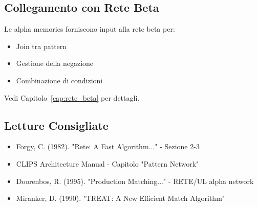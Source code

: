 \subsection{Collegamento con Rete Beta}

Le alpha memories forniscono input alla rete beta per:
\begin{itemize}
\item Join tra pattern
\item Gestione della negazione
\item Combinazione di condizioni
\end{itemize}

Vedi Capitolo~\ref{cap:rete_beta} per dettagli.

\subsection{Letture Consigliate}

\begin{itemize}
\item Forgy, C. (1982). "Rete: A Fast Algorithm..." - Sezione 2-3
\item CLIPS Architecture Manual - Capitolo "Pattern Network"
\item Doorenbos, R. (1995). "Production Matching..." - RETE/UL alpha network
\item Miranker, D. (1990). "TREAT: A New Efficient Match Algorithm"
\end{itemize}
